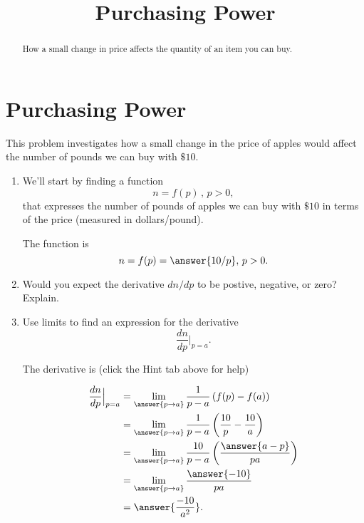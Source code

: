 \documentclass{ximera}
\title{Purchasing Power}
\begin{document}
\begin{abstract}
How a small change in price affects the quantity of an item you can buy.
\end{abstract}
\maketitle


\section{Purchasing Power}

\begin{question} \label{Qdgvvbrtghgygrert}
This problem investigates how a small change in the price of apples would affect the number of pounds we can buy with $\$10$.

\begin{enumerate}

\item We'll start by finding a function
\[
       n = f(p) \, , \, p>0 ,
\]
that expresses the number of pounds of apples we can buy with $\$10$ in terms of the price (measured in dollars/pound).

The function is
\[
       n = f(p) = \answer{10/p} ,\, p>0.
\]

\item Would you expect the derivative $dn/dp$ to be postive, negative, or zero? Explain.

\item Use limits to find an expression for the derivative
\[
    \frac{dn}{dp} \Big|_{p=a}.
\]

The derivative is (click the Hint tab above for help)

\begin{hint}
\begin{align*}
          \frac{dn}{dp} \Big|_{p=a} &= \lim_{\answer{p\to a}} \frac{1}{p-a} \left( f(p)-f(a) \right)  \\
                                                 &=  \lim_{\answer{p\to a}} \frac{1}{p-a} \left(\frac{10}{p} - \frac{10}{a} \right)  \\
                                                 &=  \lim_{\answer{p\to a}} \frac{10}{p-a} \left(\frac{\answer{a-p}}{pa} \right)  \\
                                                  &=  \lim_{\answer{p\to a}} \frac{\answer{-10}}{pa} \\
                                                  & = \answer{\frac{-10}{a^2}} .
\end{align*}
\end{hint}


\end{enumerate}
\end{question}
\end{document}
